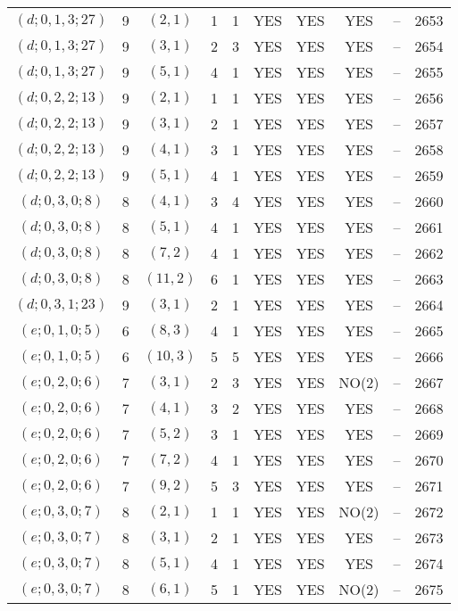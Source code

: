 \begin{longtable}{|c|c|c|c|c|c|c|c|c|c|}
$(d; 0, 1, 3; 27)$ & 9 & $(2, 1)$ & 1 & 1 & YES & YES & YES & -- & 2653\\
$(d; 0, 1, 3; 27)$ & 9 & $(3, 1)$ & 2 & 3 & YES & YES & YES & -- & 2654\\
$(d; 0, 1, 3; 27)$ & 9 & $(5, 1)$ & 4 & 1 & YES & YES & YES & -- & 2655\\
$(d; 0, 2, 2; 13)$ & 9 & $(2, 1)$ & 1 & 1 & YES & YES & YES & -- & 2656\\
$(d; 0, 2, 2; 13)$ & 9 & $(3, 1)$ & 2 & 1 & YES & YES & YES & -- & 2657\\
$(d; 0, 2, 2; 13)$ & 9 & $(4, 1)$ & 3 & 1 & YES & YES & YES & -- & 2658\\
$(d; 0, 2, 2; 13)$ & 9 & $(5, 1)$ & 4 & 1 & YES & YES & YES & -- & 2659\\
$(d; 0, 3, 0; 8)$ & 8 & $(4, 1)$ & 3 & 4 & YES & YES & YES & -- & 2660\\
$(d; 0, 3, 0; 8)$ & 8 & $(5, 1)$ & 4 & 1 & YES & YES & YES & -- & 2661\\
$(d; 0, 3, 0; 8)$ & 8 & $(7, 2)$ & 4 & 1 & YES & YES & YES & -- & 2662\\
$(d; 0, 3, 0; 8)$ & 8 & $(11, 2)$ & 6 & 1 & YES & YES & YES & -- & 2663\\
$(d; 0, 3, 1; 23)$ & 9 & $(3, 1)$ & 2 & 1 & YES & YES & YES & -- & 2664\\
$(e; 0, 1, 0; 5)$ & 6 & $(8, 3)$ & 4 & 1 & YES & YES & YES & -- & 2665\\
$(e; 0, 1, 0; 5)$ & 6 & $(10, 3)$ & 5 & 5 & YES & YES & YES & -- & 2666\\
$(e; 0, 2, 0; 6)$ & 7 & $(3, 1)$ & 2 & 3 & YES & YES & NO(2) & -- & 2667\\
$(e; 0, 2, 0; 6)$ & 7 & $(4, 1)$ & 3 & 2 & YES & YES & YES & -- & 2668\\
$(e; 0, 2, 0; 6)$ & 7 & $(5, 2)$ & 3 & 1 & YES & YES & YES & -- & 2669\\
$(e; 0, 2, 0; 6)$ & 7 & $(7, 2)$ & 4 & 1 & YES & YES & YES & -- & 2670\\
$(e; 0, 2, 0; 6)$ & 7 & $(9, 2)$ & 5 & 3 & YES & YES & YES & -- & 2671\\
$(e; 0, 3, 0; 7)$ & 8 & $(2, 1)$ & 1 & 1 & YES & YES & NO(2) & -- & 2672\\
$(e; 0, 3, 0; 7)$ & 8 & $(3, 1)$ & 2 & 1 & YES & YES & YES & -- & 2673\\
$(e; 0, 3, 0; 7)$ & 8 & $(5, 1)$ & 4 & 1 & YES & YES & YES & -- & 2674\\
$(e; 0, 3, 0; 7)$ & 8 & $(6, 1)$ & 5 & 1 & YES & YES & NO(2) & -- & 2675\\

\end{longtable}
